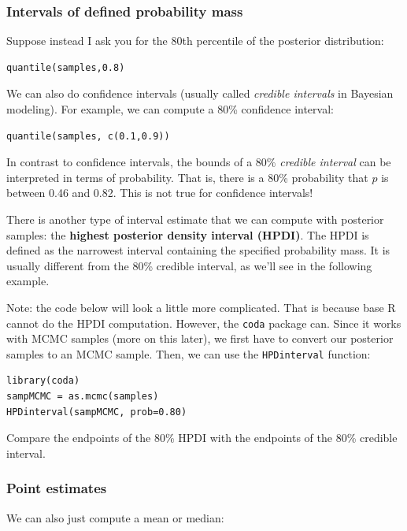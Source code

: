 \documentclass[11pt]{article}
\begin{document}
\subsubsection*{Intervals of defined probability mass}
\label{sec-2-3-2}

Suppose instead I ask you for the 80th percentile of the posterior distribution:

\begin{verbatim}
quantile(samples,0.8)
\end{verbatim}

We can also do confidence intervals (usually called \emph{credible intervals} in Bayesian modeling).  For example, we can compute a 80\% confidence interval:

\begin{verbatim}
quantile(samples, c(0.1,0.9))
\end{verbatim}

In contrast to confidence intervals, the bounds of a 80\% \emph{credible interval} can be interpreted in terms of probability.  That is, there is a 80\% probability that $p$ is between 0.46 and 0.82.  This is not true for confidence intervals!

There is another type of interval estimate that we can compute with posterior samples: the \textbf{highest posterior density interval (HPDI)}.  The HPDI is defined as the narrowest interval containing the specified probability mass.  It is usually different from the 80\% credible interval, as we'll see in the following example.

Note: the code below will look a little more complicated.  That is because base R cannot do the HPDI computation.  However, the \texttt{coda} package can.  Since it works with MCMC samples (more on this later), we first have to convert our posterior samples to an MCMC sample.  Then, we can use the \texttt{HPDinterval} function:

\begin{verbatim}
library(coda)
sampMCMC = as.mcmc(samples)
HPDinterval(sampMCMC, prob=0.80)
\end{verbatim}

Compare the endpoints of the 80\% HPDI with the endpoints of the 80\% credible interval.

\subsubsection*{Point estimates}
\label{sec-2-3-3}
We can also just compute a mean or median:
\end{document}

